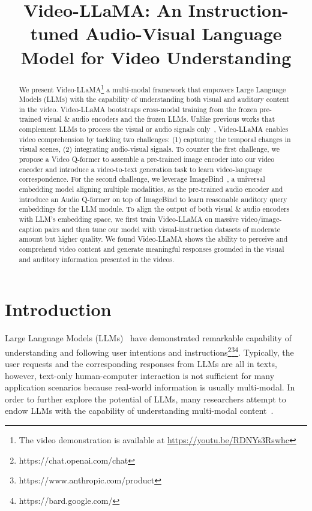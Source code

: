 \title{Video-LLaMA: An Instruction-tuned Audio-Visual Language Model for Video Understanding}



\maketitle
\begin{abstract}
We present Video-LLaMA\footnote{The video demonstration is available at \url{https://youtu.be/RDNYs3Rswhc}} a multi-modal framework that empowers Large Language Models (LLMs) with the capability of understanding both visual and auditory content in the video. Video-LLaMA bootstraps cross-modal training from the frozen pre-trained visual \& audio encoders and the frozen LLMs. Unlike previous works that complement LLMs to process the visual or audio signals only~\citep{zhu2023minigpt,liu2023visualit,huang2023audiogpt}, Video-LLaMA enables video comprehension by tackling two challenges: (1) capturing the temporal changes in visual scenes, (2) integrating audio-visual signals. To counter the first challenge, we propose a Video Q-former to assemble a pre-trained image encoder into our video encoder and introduce a video-to-text generation task to learn video-language correspondence. For the second challenge, we leverage ImageBind~\citep{girdhar2023imagebind}, a universal embedding model aligning multiple modalities, as the pre-trained audio encoder and introduce an Audio Q-former on top of ImageBind to learn reasonable auditory query embeddings for the LLM module. To align the output of both visual \& audio encoders with LLM's embedding space, we first train Video-LLaMA on massive video/image-caption pairs and then tune our model with visual-instruction datasets of moderate amount but higher quality. We found Video-LLaMA shows the ability to perceive and comprehend video content and generate meaningful responses grounded in the visual and auditory information presented in the videos.  %
\end{abstract}

\section{Introduction}

Large Language Models (LLMs)~\citep{chowdhery2022palm,bai2022constitutional,openai2023gpt4tr} have demonstrated remarkable capability of understanding and following user intentions and instructions\footnote{https://chat.openai.com/chat}\footnote{https://www.anthropic.com/product}\footnote{https://bard.google.com/}. Typically, the user requests and the corresponding responses from LLMs are all in texts, however, text-only human-computer interaction is not sufficient for many application scenarios because real-world information is usually multi-modal. In order to further explore the potential of LLMs, many researchers attempt to endow LLMs with the capability of understanding multi-modal content~\citep{huang2023audiogpt,zhang2023speechgpt,yin2023survey}. 

